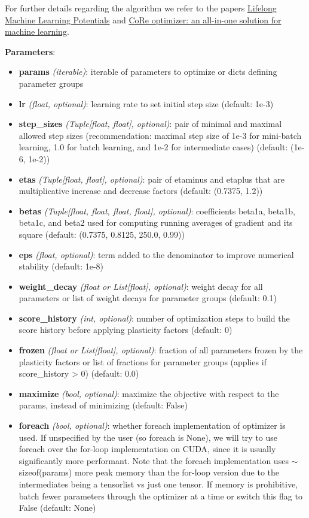 \documentclass[11pt,a4paper]{article}
\begin{document}
For further details regarding the algorithm we refer to the papers \textcolor{blue}{\href{https://doi.org/10.1021/acs.jctc.3c00279}{Lifelong Machine Learning Potentials}} and \textcolor{blue}{\href{https://doi.org/10.1088/2632-2153/ad1f76}{CoRe optimizer: an all-in-one solution for machine learning}}.

\vspace*{0.8cm}
\textbf{Parameters}:
\begin{itemize}
    \item \textbf{params} \textit{(iterable)}: iterable of parameters to optimize or dicts defining parameter groups
    \item \textbf{lr} \textit{(float, optional)}: learning rate to set initial step size (default: 1e-3)
    \item \textbf{step{\_}sizes} \textit{(Tuple[float, float], optional)}: pair of minimal and maximal allowed step sizes (recommendation: maximal step size of 1e-3 for mini-batch learning, 1.0 for batch learning, and 1e-2 for intermediate cases) (default: (1e-6, 1e-2))
    \item \textbf{etas} \textit{(Tuple[float, float], optional)}: pair of etaminus and etaplus that are multiplicative increase and decrease factors (default: (0.7375, 1.2))
    \item \textbf{betas} \textit{(Tuple[float, float, float, float], optional)}: coefficients beta1a, beta1b, beta1c, and beta2 used for computing running averages of gradient and its square (default: (0.7375, 0.8125, 250.0, 0.99))
    \item \textbf{eps} \textit{(float, optional)}: term added to the denominator to improve numerical stability (default: 1e-8)
    \item \textbf{weight{\_}decay} \textit{(float or List[float], optional)}: weight decay for all parameters or list of weight decays for parameter groups (default: 0.1)
    \item \textbf{score{\_}history} \textit{(int, optional)}: number of optimization steps to build the score history before applying plasticity factors (default: 0)
    \item \textbf{frozen} \textit{(float or List[float], optional)}: fraction of all parameters frozen by the plasticity factors or list of fractions for parameter groups (applies if score{\_}history > 0) (default: 0.0)
    \item \textbf{maximize} \textit{(bool, optional)}: maximize the objective with respect to the params, instead of minimizing (default: False)
    \item \textbf{foreach} \textit{(bool, optional)}: whether foreach implementation of optimizer is used. If unspecified by the user (so foreach is None), we will try to use foreach over the for-loop implementation on CUDA, since it is usually significantly more performant. Note that the foreach implementation uses $\sim$ sizeof(params) more peak memory than the for-loop version due to the intermediates being a tensorlist vs just one tensor. If memory is prohibitive, batch fewer parameters through the optimizer at a time or switch this flag to False (default: None)
\end{itemize}
\end{document}
